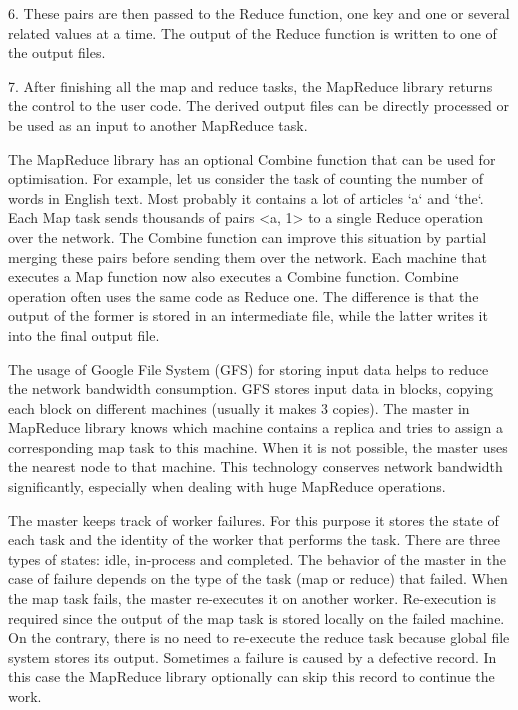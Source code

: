 6. These pairs are then passed to the Reduce function, one key and one or several related values at a time.
The output of the Reduce function is written to one of the output files.

7. After finishing all the map and reduce tasks, the MapReduce library returns the control to the user code.
The derived output files can be directly processed or be used as an input to another MapReduce task.

The MapReduce library has an optional Combine function that can be used for optimisation.
For example, let us consider the task of counting the number of words in English text.
Most probably it contains a lot of articles `a` and `the`.
Each Map task sends thousands of pairs <a, 1> to a single Reduce operation over the network. 
The Combine function can improve this situation by partial merging these pairs before sending them over the network.
Each machine that executes a Map function now also executes a Combine function.
Combine operation often uses the same code as Reduce one.
The difference is that the output of the former is stored in an intermediate file, while the latter writes it into the final output file.

The usage of Google File System (GFS) for storing input data helps to reduce the network bandwidth consumption.
GFS stores input data in blocks, copying each block on different machines (usually it makes 3 copies).
The master in MapReduce library knows which machine contains a replica and tries to assign a corresponding map task to this machine.   
When it is not possible, the master uses the nearest node to that machine.
This technology conserves network bandwidth significantly, especially when dealing with huge MapReduce operations.
 
The master keeps track of worker failures.
For this purpose it stores the state of each task and the identity of the worker that performs the task.
There are three types of states: idle, in-process and completed.
The behavior of the master in the case of failure depends on the type of the task (map or reduce) that failed.
When the map task fails, the master re-executes it on another worker.
Re-execution is required since the output of the map task is stored locally on the failed machine.
On the contrary, there is no need to re-execute the reduce task because global file system stores its output.
Sometimes a failure is caused by a defective record.
In this case the MapReduce library optionally can skip this record to continue the work. 
 
